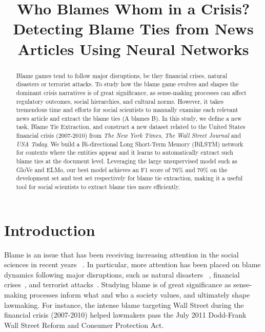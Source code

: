 \documentclass[letterpaper]{article} %
\begin{document}
\title{Who Blames Whom in a Crisis? Detecting Blame Ties from News Articles Using Neural Networks}
\maketitle
\begin{abstract}
Blame games tend to follow major disruptions, be they financial crises, natural disasters or terrorist attacks. To study how the blame game evolves and shapes the dominant crisis narratives is of great significance, as sense-making processes can affect regulatory outcomes, social hierarchies, and cultural norms. However, it takes tremendous time and efforts for social scientists to manually examine each relevant news article and extract the blame ties (A blames B). In this study, we define a new task, Blame Tie Extraction, and construct a new dataset related to the United States financial crisis (2007-2010) from {\it The New York Times}, {\it The Wall Street Journal} and {\it USA Today}. We build a Bi-directional Long Short-Term Memory (BiLSTM) network for contexts where the entities appear and it learns to automatically extract such blame ties at the document level. Leveraging the large unsupervised model such as GloVe and ELMo, our best model achieves an F1 score of 76\% and 70\% on the development set and test set respectively for blame tie extraction, making it a useful tool for social scientists to extract blame ties more efficiently.
\end{abstract}

\section{Introduction}

Blame is an issue that has been receiving increasing attention in the social sciences in recent years ~\cite{alicke2000culpable,mary1992risk,farmer2006aids,gephart1993textual,hobolt2014blaming,hood2010blame,shaver2012attribution,tilly2009credit}. In particular, more attention has been placed on blame dynamics following major disruptions, such as natural disasters ~\cite{boin2010leadership,malhotra2008attributing}, financial crises~\cite{nicolno,tourish2012metaphors}, and terrorist attacks~\cite{olmeda2008reversal}. Studying blame is of great significance as sense-making processes inform what and who a society values, and ultimately shape lawmaking. For instance, the intense blame targeting Wall Street during the financial crisis (2007-2010) helped lawmakers pass the July 2011 Dodd-Frank Wall Street Reform and Consumer Protection Act.
\end{document}
